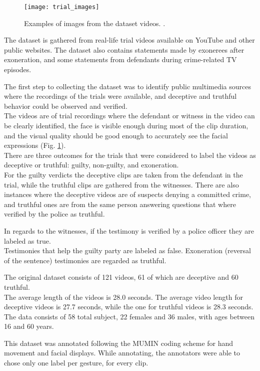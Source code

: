 \begin{figure}[H]
	\centering
	\texttt{[image: trial\_images]}
	\caption{Examples of images from the dataset videos. \cite{Perez-Rosas:2015:DDU:2818346.2820758}.}
	\label{fig:trial_images}
\end{figure}


The dataset is gathered from real-life trial videos available on YouTube and other public websites. The dataset also contains statements made by exonerees after exoneration, and some statements from defendants during crime-related TV episodes.

The first step to collecting the dataset was to identify public multimedia sources where the recordings of the trials were available, and deceptive and truthful behavior could be observed and verified.\\
The videos are of trial recordings where the defendant or witness in the video can be clearly identified, the face is visible enough during most of the clip duration, and the visual quality should be good enough to accurately see the facial expressions (Fig. \ref{fig:trial_images}).\\
There are three outcomes for the trials that were considered to label the videos as deceptive or truthful: guilty, non-guilty, and exoneration. \\
For the guilty verdicts the deceptive clips are taken from the defendant in the trial, while the truthful clips are gathered from the witnesses. There are also instances where the deceptive videos are of suspects denying a committed crime, and truthful ones are from the same person answering questions that where verified by the police as truthful.

In regards to the witnesses, if the testimony is verified by a police officer they are labeled as true. \\ 
Testimonies that help the guilty party are labeled as false. Exoneration (reversal of the sentence) testimonies are regarded as truthful.

The original dataset consists of 121 videos, 61 of which are deceptive and 60 truthful. \\
The average length of the videos is 28.0 seconds. The average video length for deceptive videos is 27.7 seconds, while the one for truthful videos is 28.3 seconds. \\
The data consists of 58 total subject, 22 females and 36 males, with ages between 16 and 60 years.

This dataset was annotated following the MUMIN coding scheme for hand movement and facial displays. While annotating, the annotators were able to chose only one label per gesture, for every clip.

